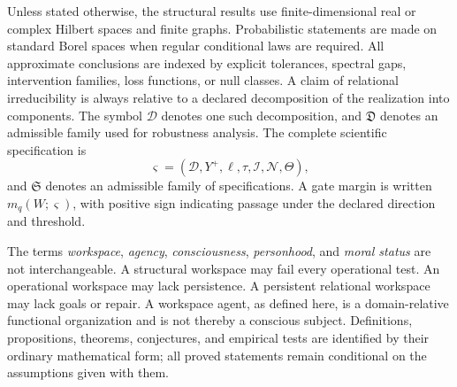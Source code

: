 Unless stated otherwise, the structural results use finite-dimensional real or complex Hilbert spaces and
finite graphs. Probabilistic statements are made on standard Borel spaces when regular conditional laws are
required. All approximate conclusions are indexed by explicit tolerances, spectral gaps, intervention
families, loss functions, or null classes. A claim of relational irreducibility is always relative to a declared
decomposition of the realization into components. The symbol \(\mathcal D\) denotes one such
decomposition, and \(\mathfrak D\) denotes an admissible family used for robustness analysis. The complete
scientific specification is
\[
\varsigma=(\mathcal D,Y^+,\ell,\tau,\mathcal I,\mathcal N,\Theta),
\]
and \(\mathfrak S\) denotes an admissible family of specifications. A gate margin is written
\(m_q(W;\varsigma)\), with positive sign indicating passage under the declared direction and threshold.

The terms \emph{workspace}, \emph{agency}, \emph{consciousness}, \emph{personhood}, and \emph{moral status}
are not interchangeable. A structural workspace may fail every operational test. An operational workspace
may lack persistence. A persistent relational workspace may lack goals or repair. A workspace agent, as
defined here, is a domain-relative functional organization and is not thereby a conscious subject. Definitions,
propositions, theorems, conjectures, and empirical tests are identified by their ordinary mathematical form;
all proved statements remain conditional on the assumptions given with them.

